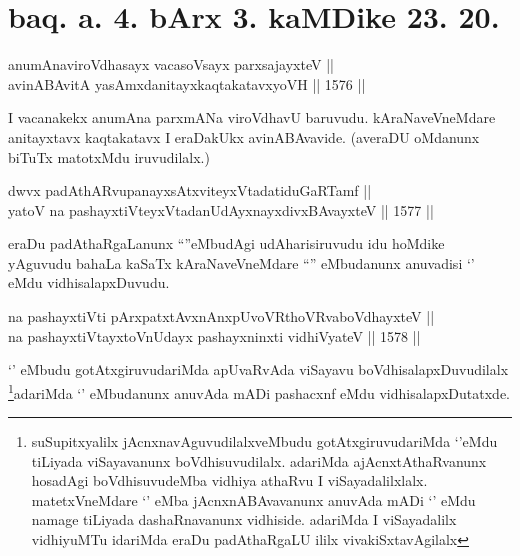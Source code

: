 \section*{baq. a. 4. bArx 3. kaMDike 23. 20.}

\begin{shl}
anumAnaviroVdhasayx vacasoV\s sayx parxsajayxteV || \\
avinABAvitA yasAmxdanitayxkaqtakatavxyoVH \hfill || 1576 || 
\end{shl}

\begin{artha}
I vacanakekx anumAna parxmANa viroVdhavU baruvudu. kAraNaveVneMdare anitayxtavx kaqtakatavx I eraDakUkx avinABAvavide. (averaDU oMdanunx biTuTx matotxMdu iruvudilalx.)
\end{artha}


\begin{shl}
dwvx padAthARvupanayxsAtxviteyxVtadatiduGaRTamf || \\
yatoV na pashayxtiVteyxVtadanUdAyxnayxdivxBAvayxteV \hfill || 1577 ||  
\end{shl}

\begin{artha}
eraDu padAthaRgaLanunx ``\stext''eMbudAgi udAharisiruvudu idu hoMdike yAguvudu bahaLa kaSaTx kAraNaveVneMdare ``\stext'' eMbudanunx anuvadisi `\stext' eMdu vidhisalapxDuvudu.
\end{artha}


\begin{shl}
na pashayxtiVti pArxpatxtAvxnAnxpUvoVR\s thoVR\s vaboVdhayxteV ||  \\
na pashayxtiVtayxtoV\s nUdayx pashayxninxti vidhiVyateV \hfill || 1578 ||  
\end{shl}

\begin{artha}
`\stext' eMbudu gotAtxgiruvudariMda apUvaRvAda viSayavu boVdhisalapxDuvudilalx \footnote{suSupitxyalilx jAcnxnavAguvudilalxveMbudu gotAtxgiruvudariMda `\stext'eMdu tiLiyada viSayavanunx boVdhisuvudilalx. adariMda ajAcnxtAthaRvanunx hosadAgi boVdhisuvudeMba vidhiya athaRvu I viSayadalilxlalx. matetxVneMdare `\stext' eMba jAcnxnABAvavanunx anuvAda mADi `\stext' eMdu namage tiLiyada dashaRnavanunx vidhiside. adariMda I viSayadalilx vidhiyuMTu idariMda eraDu padAthaRgaLU ililx vivakiSxtavAgilalx}adariMda `\stext' eMbudanunx anuvAda mADi pashacxnf eMdu vidhisalapxDutatxde.
\end{artha}

